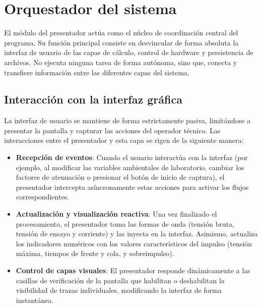 \section{Orquestador del sistema}
\label{sec:orquestador_sistema}

El módulo del presentador actúa como el núcleo de coordinación central del programa. Su función principal consiste en desvincular de forma absoluta la interfaz de usuario de las capas de cálculo, control de hardware y persistencia de archivos. No ejecuta ninguna tarea de forma autónoma, sino que, conecta y transfiere información entre las diferentes capas del sistema.

\subsection{Interacción con la interfaz gráfica}
La interfaz de usuario se mantiene de forma estrictamente pasiva, limitándose a presentar la pantalla y capturar las acciones del operador técnico. Las interacciones entre el presentador y esta capa se rigen de la siguiente manera:
\begin{itemize}
    \item \textbf{Recepción de eventos}: Cuando el usuario interactúa con la interfaz (por ejemplo, al modificar las variables ambientales de laboratorio, cambiar los factores de atenuación o presionar el botón de inicio de captura), el presentador intercepta asíncronamente estas acciones para activar los flujos correspondientes.
    \item \textbf{Actualización y visualización reactiva}: Una vez finalizado el procesamiento, el presentador toma las formas de onda (tensión bruta, tensión de ensayo y corriente) y las inyecta en la interfaz. Asimismo, actualiza los indicadores numéricos con los valores característicos del impulso (tensión máxima, tiempos de frente y cola, y sobreimpulso).
    \item \textbf{Control de capas visuales}: El presentador responde dinámicamente a las casillas de verificación de la pantalla que habilitan o deshabilitan la visibilidad de trazas individuales, modificando la interfaz de forma instantánea.
\end{itemize}

